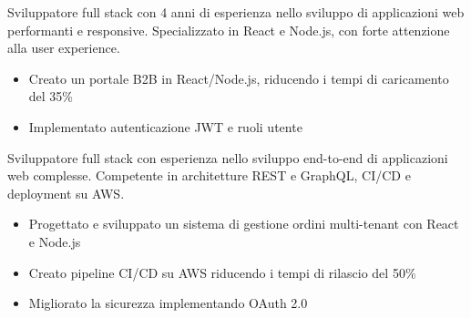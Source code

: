 \documentclass[10pt,a4paper]{altacv}
\begin{document}
\makecvheader

Sviluppatore full stack con 4 anni di esperienza nello sviluppo di applicazioni web performanti e responsive. Specializzato in React e Node.js, con forte attenzione alla user experience.

\begin{itemize}
\item Creato un portale B2B in React/Node.js, riducendo i tempi di caricamento del 35\%
\item Implementato autenticazione JWT e ruoli utente
\end{itemize}

       


\newpage


\makecvheader

Sviluppatore full stack con esperienza nello sviluppo end-to-end di applicazioni web complesse. Competente in architetture REST e GraphQL, CI/CD e deployment su AWS.

\begin{itemize}
\item Progettato e sviluppato un sistema di gestione ordini multi-tenant con React e Node.js
\item Creato pipeline CI/CD su AWS riducendo i tempi di rilascio del 50\%
\item Migliorato la sicurezza implementando OAuth 2.0
\end{itemize}

              
\end{document}
